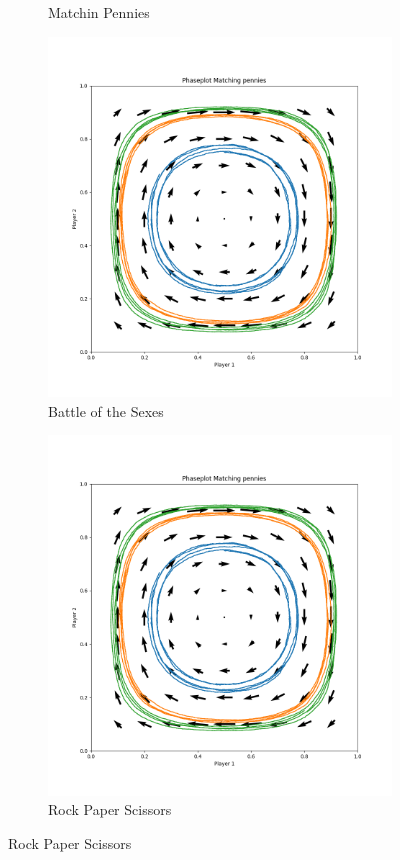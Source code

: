 \documentclass[10pt,a4paper]{article}
\begin{document}
\begin{figure}[h]
\begin{subfigure}[b]{0.33\textwidth}
        \caption{Matchin Pennies}
    \end{subfigure}
    \begin{subfigure}[b]{0.33\textwidth}
        \includegraphics[width=\textwidth]{Figures/cl_mp.png}
        \caption{Battle of the Sexes}
    \end{subfigure}
    \begin{subfigure}[b]{0.33\textwidth}
        \includegraphics[width=\textwidth]{Figures/cl_mp.png}
        \caption{Rock Paper Scissors} 
    \end{subfigure}
    \label{fig:learning}
\end{figure}
\end{document}
